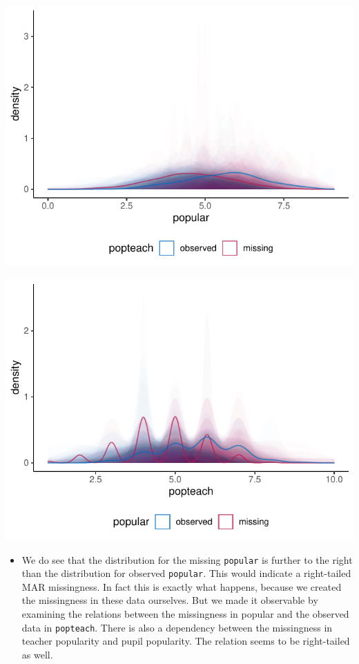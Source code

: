 \documentclass[
]{jss}
\providecommand{\tightlist}{%
  \setlength{\itemsep}{0pt}\setlength{\parskip}{0pt}}
\begin{document}
\begin{CodeChunk}


\begin{center}\includegraphics{Manuscript_files/figure-latex/pop_dist-1} \end{center}



\begin{center}\includegraphics{Manuscript_files/figure-latex/pop_dist-2} \end{center}

\end{CodeChunk}

\begin{itemize}
\tightlist
\item
  We do see that the distribution for the missing \texttt{popular} is
  further to the right than the distribution for observed
  \texttt{popular}. This would indicate a right-tailed MAR missingness.
  In fact this is exactly what happens, because we created the
  missingness in these data ourselves. But we made it observable by
  examining the relations between the missingness in popular and the
  observed data in \texttt{popteach}. There is also a dependency between
  the missingness in teacher popularity and pupil popularity. The
  relation seems to be right-tailed as well.
\end{itemize}
\end{document}
